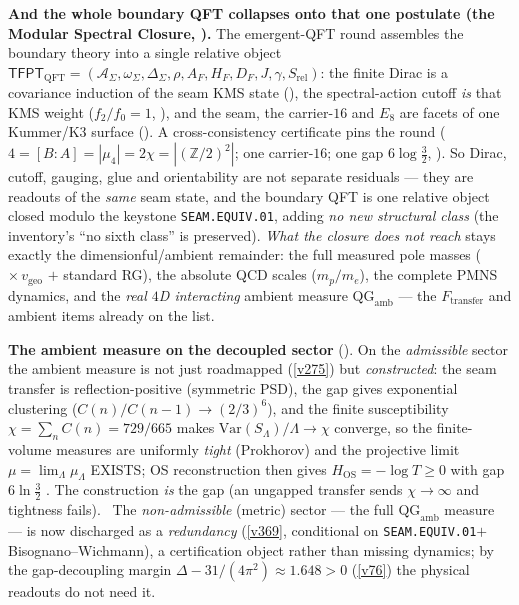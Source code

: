 \documentclass[11pt,a4paper]{article}
\newcommand{\Z}{\mathbb Z}
\begin{document}
\par\smallskip\noindent\textbf{And the whole boundary QFT collapses onto that one postulate (the Modular
Spectral Closure, ).} The emergent-QFT round assembles the boundary
theory into a single relative object $\mathsf{TFPT}_{\mathrm{QFT}}=(\mathcal A_\Sigma,\omega_\Sigma,
\Delta_\Sigma,\rho,A_F,H_F,D_F,J,\gamma,S_{\mathrm{rel}})$: the finite Dirac is a covariance induction of the
seam KMS state (), the spectral-action cutoff \emph{is} that KMS
weight ($f_2/f_0{=}1$, ), and the seam, the carrier-$16$ and $E_8$ are
facets of one Kummer/K3 surface (). A cross-consistency certificate
pins the round ($4=[B{:}A]=|\mu_4|=2\chi=|(\Z/2)^2|$; one carrier-$16$; one gap $6\log\tfrac32$,
). So Dirac, cutoff, gauging, glue and orientability are not
separate residuals --- they are readouts of the \emph{same} seam state, and the boundary QFT is one relative
object closed modulo the keystone \texttt{SEAM.EQUIV.01}, adding \emph{no new structural class} (the inventory's
``no sixth class'' is preserved). \emph{What the closure does \emph{not} reach} stays exactly the
dimensionful/ambient remainder: the full measured pole masses ($\times\,v_{\mathrm{geo}}$ $+$ standard RG),
the absolute QCD scales ($m_p/m_e$), the complete PMNS dynamics, and the \emph{real $4$D interacting} ambient
measure $\mathrm{QG}_{\mathrm{amb}}$ --- the $F_{\mathrm{transfer}}$ and ambient items already on the list.

\par\smallskip\noindent\textbf{The ambient measure on the decoupled sector}
(). On the \emph{admissible} sector the ambient measure is not just
roadmapped (\vref{v275}) but \emph{constructed}: the seam transfer is reflection-positive (symmetric PSD), the gap
gives exponential clustering ($C(n)/C(n{-}1)\to(2/3)^6$), and the finite susceptibility $\chi=\sum_n C(n)=729/665$
makes $\mathrm{Var}(S_\Lambda)/\Lambda\to\chi$ converge, so the finite-volume measures are uniformly \emph{tight}
(Prokhorov) and the projective limit $\mu=\lim_\Lambda\mu_\Lambda$ EXISTS; OS reconstruction then gives
$H_{\mathrm{OS}}{=}-\log T\ge0$ with gap $6\ln\tfrac32$ \mE. The construction \emph{is} the gap (an ungapped
transfer sends $\chi\to\infty$ and tightness fails). \mC\ The \emph{non-admissible}
(metric) sector --- the full $\mathrm{QG}_{\mathrm{amb}}$ measure --- is now discharged as a \emph{redundancy}
(\vref{v369}, conditional on \texttt{SEAM.EQUIV.01}${+}$Bisognano--Wichmann), a certification object rather than
missing dynamics; by the gap-decoupling margin $\Delta-31/(4\pi^2)\approx1.648>0$ (\vref{v76}) the physical readouts
do not need it.
\end{document}
